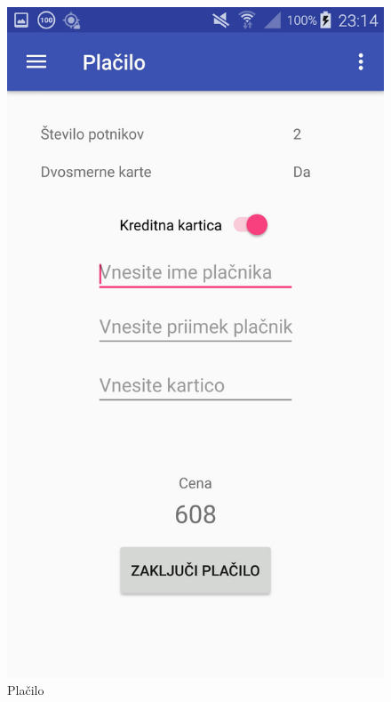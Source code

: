 \documentclass[11pt,a4paper]{article}
\begin{document}
\begin{figure}[htb]
	\centerline{\includegraphics[width=1.0\textwidth]{GUI/placilo.jpg}}
	\caption{Plačilo}
	\label{sl:koncept}
\end{figure}
\end{document}
